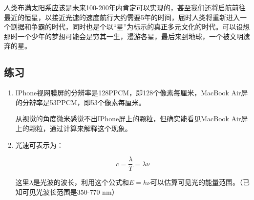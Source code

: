 人类布满太阳系应该是未来100-200年内肯定可以实现的，甚至我们还将启航前往最近的恒星，以接近光速的速度航行大约需要5年的时间，届时人类将重新进入一个割据和争霸的时代，同时也是个以“星”为标示的真正多元文化的时代。可以设想那时一个少年的梦想可能会是穷其一生，漫游各星，最后来到地球，一个被文明遗弃的星。


\subsection*{练习}

\begin{enumerate}
\item 

IPhone视网膜屏的分辨率是128PPCM，即128个像素每厘米，MacBook Air屏的分辨率是53PPCM，即53个像素每厘米。

从视觉的角度微米感觉不出IPhone屏上的颗粒，但确实能看见MacBook Air屏上的颗粒，通过计算来解释这个现象。

\item 

光速可表示为：

\begin{equation}
c = \frac{\lambda}{T}=\lambda \nu
\end{equation}

这里$\lambda$是光波的波长，利用这个公式和$E = h \nu$可以估算可见光的能量范围。（已知可见光波长范围是350-770 nm）


\end{enumerate}






